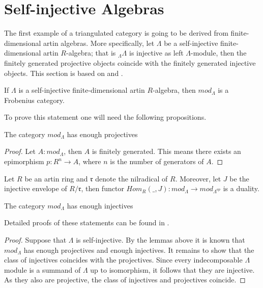 \section{Self-injective Algebras}

    The first example of a triangulated category is going to be derived from finite-dimensional artin algebras. More specifically, let $\Lambda$ be a self-injective finite-dimensional artin $R$-algebra; that is $_{\Lambda}\Lambda$ is injective as left $\Lambda$-module, then the finitely generated projective objects coincide with the finitely generated injective objects. This section is based on \cite{Rei95} and \cite{Kra12}.

    \begin{prop}
        If $\Lambda$ is a self-injective finite-dimensional artin $R$-algebra, then $mod_{\Lambda}$ is a Frobenius category.
    \end{prop}

    To prove this statement one will need the following propositions.

    \begin{lemma}
        The category $mod_{\Lambda}$ has enough projectives
    \end{lemma}

    \begin{proof}
        Let $A:mod_{\Lambda}$, then $A$ is finitely generated. This means there exists an epimorphism $p:R^n\rightarrow A$, where $n$ is the number of generators of $A$.
    \end{proof}

    \begin{lemma}
        Let $R$ be an artin ring and $\mathfrak{r}$ denote the nilradical of $R$. Moreover, let $J$ be the injective envelope of $R/\mathfrak{r}$, then functor $Hom_R(\_,J):mod_{\Lambda}\rightarrow mod_{\Lambda^{op}}$ is a duality.
    \end{lemma}

    \begin{corollary}
        The category $mod_{\Lambda}$ has enough injectives
    \end{corollary}

    Detailed proofs of these statements can be found in \cite{Rei95}.

    \begin{proof}
        Suppose that $\Lambda$ is self-injective. By the lemmas above it is known that $mod_{\Lambda}$ has enough projectives and enough injectives. It remains to show that the class of injectives coincides with the projectives. Since every indecomposable $\Lambda$ module is a summand of $\Lambda$ up to isomorphism, it follows that they are injective. As they also are projective, the class of injectives and projectives coincide.
    \end{proof}

